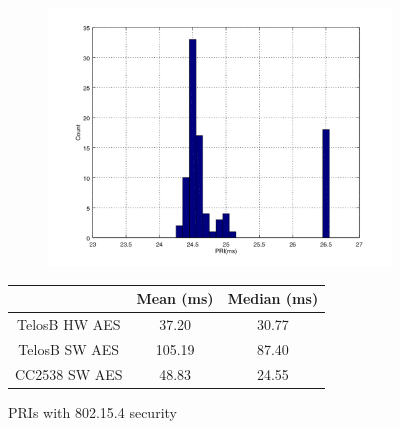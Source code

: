 \begin{figure}[ht!]
\begin{subfigure}{0.4\textwidth}
{		\includegraphics[width=\textwidth]{fig/noncoresec_ping_cc2538_sw.png}
	}
	\end{subfigure}

	{
		\begin{tabular}{|c|c|c|}
			\hline
			              & Mean (ms)     & Median (ms)   \\ \hline
			TelosB HW AES & 37.20 & 30.77 \\ \hline
			TelosB SW AES & 105.19        & 87.40          \\ \hline
			CC2538 SW AES & 48.83         & 24.55          \\ \hline
		\end{tabular}
	}
	
	\caption{PRIs with 802.15.4 security\label{802154SecPRI}}
\end{figure}



